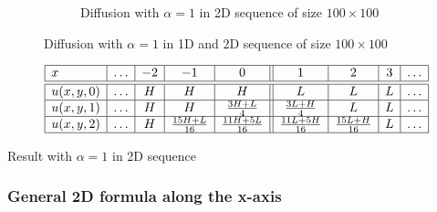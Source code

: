 \begin{figure}[ht]
\begin{subfigure}[b]{0.49\textwidth}
        \caption{Diffusion with $\alpha = 1$ in 2D sequence of size $100 \times 100$}
        \label{fig:diff_2d_100}
    \end{subfigure}
    \caption{Diffusion with $\alpha = 1$ in 1D and 2D sequence of size $100 \times 100$}
    \label{fig:diff_1d_vs_2d_100}
\end{figure}

\begin{table}[ht]
    \centering
    $$
        \begin{array}{|l|c|c|c|c||c|c|c|c|} \hline
        x       &\ldots&-2&       -1       &        0        &        1        &        2       &3&\ldots\\\hline \hline
        u(x,y,0)&\ldots& H&        H       &        H        &        L        &        L       &L&\ldots\\\hline
        u(x,y,1)&\ldots& H&        H       & \frac{3H+L}{4}  & \frac{3L+H}{4}  &        L       &L&\ldots\\\hline
        u(x,y,2)&\ldots& H&\frac{15H+L}{16}&\frac{11H+5L}{16}&\frac{11L+5H}{16}&\frac{15L+H}{16}&L&\ldots\\\hline
        \end{array}
    $$
    \caption{Result with $\alpha=1$ in 2D sequence}
    \label{tab:result_2d_1a}
\end{table}

\subsubsection{General 2D formula along the x-axis}

